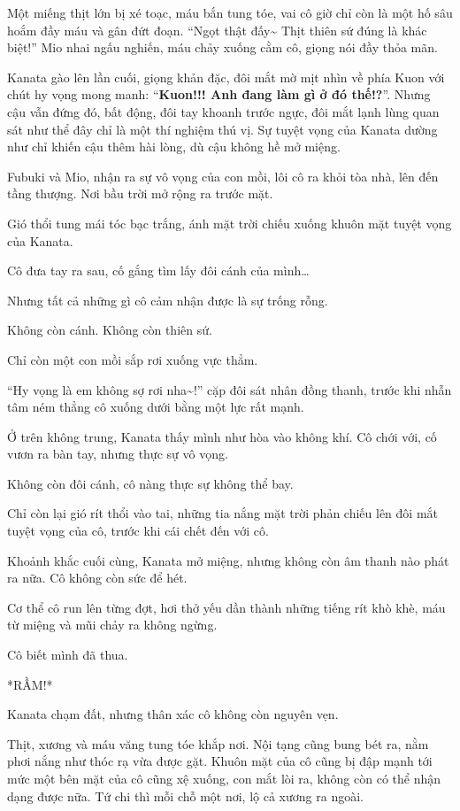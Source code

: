\documentclass[../main.tex]{subfiles}
\begin{document}
Một miếng thịt lớn bị xé toạc, máu bắn tung tóe, vai cô giờ chỉ còn là một hố sâu hoắm đầy máu và gân đứt đoạn. ``Ngọt thật đấy\~{} Thịt thiên sứ đúng là khác biệt!'' Mio nhai ngấu nghiến, máu chảy xuống cằm cô, giọng nói đầy thỏa mãn.

Kanata gào lên lần cuối, giọng khản đặc, đôi mắt mờ mịt nhìn về phía Kuon với chút hy vọng mong manh: ``\textbf{Kuon!!! Anh đang làm gì ở đó thế!?}''. Nhưng cậu vẫn đứng đó, bất động, đôi tay khoanh trước ngực, đôi mắt lạnh lùng quan sát như thể đây chỉ là một thí nghiệm thú vị. Sự tuyệt vọng của Kanata dường như chỉ khiến cậu thêm hài lòng, dù cậu không hề mở miệng.

Fubuki và Mio, nhận ra sự vô vọng của con mồi, lôi cô ra khỏi tòa nhà, lên đến tầng thượng. Nơi bầu trời mở rộng ra trước mặt.

Gió thổi tung mái tóc bạc trắng, ánh mặt trời chiếu xuống khuôn mặt tuyệt vọng của Kanata.

Cô đưa tay ra sau, cố gắng tìm lấy đôi cánh của mình\dots

Nhưng tất cả những gì cô cảm nhận được là sự trống rỗng.

Không còn cánh. Không còn thiên sứ.

Chỉ còn một con mồi sắp rơi xuống vực thẳm.

``Hy vọng là em không sợ rơi nha\~{}!'' cặp đôi sát nhân đồng thanh, trước khi nhẫn tâm ném thẳng cô xuống dưới bằng một lực rất mạnh.

Ở trên không trung, Kanata thấy mình như hòa vào không khí. Cô chới với, cố vươn ra bàn tay, nhưng thực sự vô vọng.

Không còn đôi cánh, cô nàng thực sự không thể bay.

Chỉ còn lại gió rít thổi vào tai, những tia nắng mặt trời phản chiếu lên đôi mắt tuyệt vọng của cô, trước khi cái chết đến với cô.

Khoảnh khắc cuối cùng, Kanata mở miệng, nhưng không còn âm thanh nào phát ra nữa. Cô không còn sức để hét.

Cơ thể cô run lên từng đợt, hơi thở yếu dần thành những tiếng rít khò khè, máu từ miệng và mũi chảy ra không ngừng.

Cô biết mình đã thua.

*RẦM!*

Kanata chạm đất, nhưng thân xác cô không còn nguyên vẹn.

Thịt, xương và máu văng tung tóe khắp nơi. Nội tạng cũng bung bét ra, nằm phơi nắng như thóc rạ vừa được gặt. Khuôn mặt của cô cũng bị đập mạnh tới mức một bên mặt của cô cũng xệ xuống, con mắt lòi ra, không còn có thể nhận dạng được nữa. Tứ chi thì mỗi chỗ một nơi, lộ cả xương ra ngoài.
\end{document}
